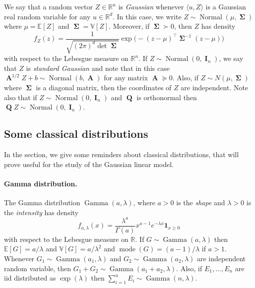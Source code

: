 \documentclass[
	fontsize=11pt, %
	twoside=false, %
	numbers=noenddot, %
]{kaobook}
\DeclareMathOperator{\bA}{{\boldsymbol A}}
\DeclareMathOperator{\bI}{{\boldsymbol I}}
\DeclareMathOperator{\bQ}{{\boldsymbol Q}}
\DeclareMathOperator{\bSigma}{\boldsymbol \Sigma}
\DeclareMathOperator{\mode}{mode}
\DeclareMathOperator{\gam}{Gamma}
\DeclareMathOperator{\nor}{Normal}
\newcommand{\E}{\mathbb E}
\newcommand{\R}{\mathbb R}
\newcommand{\var}{\mathbb V}
\newcommand{\ind}[1]{\mathbf 1_{#1}}
\newcommand{\mgeq}{\succcurlyeq}
\newcommand{\inr}[1]{\langle #1 \rangle}
\begin{document}
We say that a random vector $Z \in \R^n$ is \emph{Gaussian} whenever $\inr{u, Z}$ is a Gaussian real random variable for any $u \in \R^d$.
In this case, we write $Z \sim \nor(\mu, \bSigma)$ where $\mu = \E[Z]$ and $\bSigma = \var[Z]$.
Moreover, if $\bSigma \succ 0$, then $Z$ has density
\begin{equation*}
	f_Z(z) = \frac{1}{\sqrt{(2 \pi)^d \det \bSigma}} \exp \Big( - (z - \mu)^\top \bSigma^{-1} (z - \mu) \Big)
\end{equation*}
with respect to the Lebesgue measure on $\R^n$.
If $Z \sim \nor(0, \bI_n)$, we say that $Z$ is \emph{standard Gaussian} and note that in this case 
$\bA^{1/2} Z + b \sim \nor(b, \bA)$ for any matrix $\bA \mgeq 0$.
Also, if $Z \sim N(\mu, \bSigma)$ where $\bSigma$ is a diagonal matrix, then the coordinates of $Z$ are independent.
Note also that if $Z \sim \nor(0, \bI_n)$ and $\bQ$ is orthonormal then $\bQ Z \sim \nor(0, \bI_n)$.


\subsection{Some classical distributions} %
\label{sub:some_classical_distributions}

In the section, we give some reminders about classical distributions, that will prove useful for the study of the Gaussian linear model.


\paragraph{Gamma distribution.} %

The Gamma distribution $\gam(a, \lambda)$, where $a > 0$ is the \emph{shape} and $\lambda > 0$ is the \emph{intensity} has density
\begin{equation*}
	f_{a, \lambda}(x) = \frac{\lambda^a}{\Gamma(a)} x^{a - 1} e^{-\lambda x} \ind{x \geq 0}
\end{equation*}
with respect to the Lebesgue measure on $\R$.
%
If $G \sim \gam(a, \lambda)$ then $\E[G] = a / \lambda$ and $\var[G] = a / \lambda^2$ and $\mode(G) = (a - 1) / \lambda$ if $a > 1$.
Whenever $G_1 \sim \gam(a_1, \lambda)$ and $G_2 \sim \gam(a_2, \lambda)$ are independent random variable, then $G_1 + G_2 \sim \gam(a_1 + a_2, \lambda)$.
Also, if $E_1, \ldots, E_n$ are iid distributed as $\exp(\lambda)$ then $\sum_{i=1}^n E_i \sim \gam(n, \lambda)$.
\end{document}
